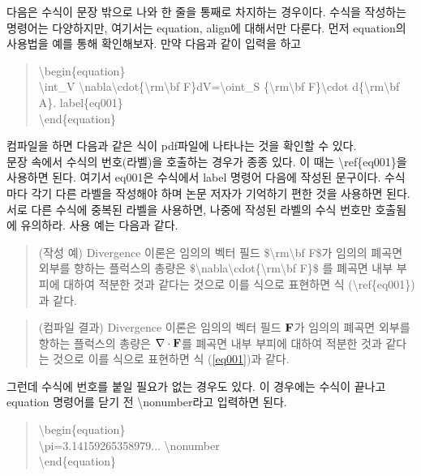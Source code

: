 \documentclass{gshs-report-v1.2}
\begin{document}
다음은 수식이 문장 밖으로 나와 한 줄을 통째로 차지하는 경우이다. 수식을 작성하는 명령어는 다양하지만, 여기서는 equation, align에 대해서만 다룬다. 먼저 equation의 사용법을 예를 통해 확인해보자. 만약 다음과 같이 입력을 하고
\begin{quote}
	{\textbackslash}begin\{equation\}\\
	{\textbackslash}int\_V 
	{\textbackslash}nabla{\textbackslash}cdot\{{\textbackslash}rm{\textbackslash}bf
	 F\}dV={\textbackslash}oint\_S \{{\textbackslash}rm{\textbackslash}bf 
	F\}{\textbackslash}cdot d\{{\textbackslash}rm{\textbackslash}bf A\}. 
	\newline{\textbackslash}label\{eq001\} \\
	{\textbackslash}end\{equation\}
\end{quote}
컴파일을 하면 다음과 같은 식이 pdf파일에 나타나는 것을 확인할 수 있다.
\begin{equation}
\end{equation}
문장 속에서 수식의 번호(라벨)을 호출하는 경우가 종종 있다. 이 때는 {\textbackslash}ref\{eq001\}을 사용하면 된다. 여기서 eq001은 수식에서 label 명령어 다음에 작성된 문구이다. 수식마다 각기 다른 라벨을 작성해야 하며 논문 저자가 기억하기 편한 것을 사용하면 된다. 서로 다른 수식에 중복된 라벨을 사용하면, 나중에 작성된 라벨의 수식 번호만 호출됨에 유의하라. 사용 예는 다음과 같다.
\begin{quote}
	(작성 예) Divergence 이론은 임의의 벡터 필드 \${\textbackslash}rm{\textbackslash}bf F\$가 임의의 폐곡면 외부를 향하는 플럭스의 총량은 \${\textbackslash}nabla{\textbackslash}cdot\{{\textbackslash}rm{\textbackslash}bf F\}\$ 를 폐곡면 내부 부피에 대하여 적분한 것과 같다는 것으로 이를 식으로 표현하면 식 ({\textbackslash}ref\{eq001\}) 과 같다.
\end{quote}
\begin{quote}
	(컴파일 결과) Divergence 이론은 임의의 벡터 필드 $\rm\bf F$가 임의의 폐곡면 외부를 향하는 플럭스의 총량은 $\nabla\cdot{\rm\bf F}$를 폐곡면 내부 부피에 대하여 적분한 것과 같다는 것으로 이를 식으로 표현하면 식 (\ref{eq001})과 같다.
\end{quote}
그런데 수식에 번호를 붙일 필요가 없는 경우도 있다. 이 경우에는 수식이 끝나고 equation 명령어를 닫기 전 {\textbackslash}nonumber라고 입력하면 된다.
\begin{quote}
	{\textbackslash}begin\{equation\}\\
	{\textbackslash}pi=3.14159265358979... {\textbackslash}nonumber \\
	{\textbackslash}end\{equation\}
\end{quote}
\end{document}
